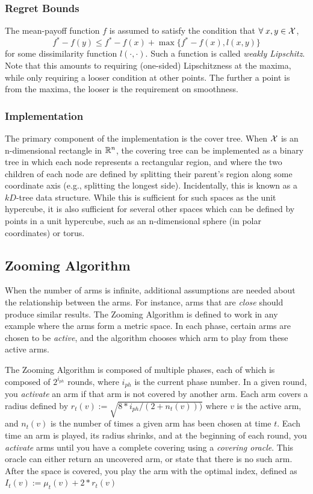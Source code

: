 \subsubsection{Regret Bounds}
The mean-payoff function $f$ is assumed to satisfy the condition that
$\forall \; x,y \in {\mathcal{X}}$,
\begin{equation*}
  f^* - f(y) \leq f^* - f(x) + \max \{f^* - f(x), l(x,y) \}
\end{equation*}
for some dissimilarity function $l(\cdot, \cdot)$. Such a function is
called \emph{weakly Lipschitz}. Note that this amounts to requiring
(one-sided) Lipschitzness at the maxima, while only requiring a looser
condition at other points. The further a point is from the maxima, the
looser is the requirement on smoothness.



\subsubsection{Implementation}
The primary component of the implementation is the cover tree. When
${\mathcal{X}}$ is an n-dimensional rectangle in $\mathbb{R}^n$, the covering tree
can be implemented as a binary tree in which each node represents a
rectangular region, and where the two children of each node are
defined by splitting their parent's region along some coordinate axis
(e.g., splitting the longest side). Incidentally, this is known as a
$kD$-tree data structure. While this is sufficient for such spaces as
the unit hypercube, it is also sufficient for several other spaces
which can be defined by points in a unit hypercube, such as an
n-dimensional sphere (in polar coordinates) or torus.

\subsection{Zooming Algorithm}
When the number of arms is infinite, additional assumptions are needed
about the relationship between the arms. For instance, arms that are
\emph{close} should produce similar results. The Zooming Algorithm is
defined to work in any example where the arms form a metric space. In
each phase, certain arms are chosen to be \emph{active}, and the
algorithm chooses which arm to play from these active arms.

The Zooming Algorithm is composed of multiple phases, each of which is
composed of $2^{i_{ph}}$ rounds, where $i_{ph}$ is the current phase
number. In a given round, you \emph{activate} an arm if that arm is
not covered by another arm. Each arm covers a radius defined by
$r_t(v):=\sqrt{8*i_{ph}/(2+n_t(v)))}$ where $v$ is the active arm, and
$n_t(v)$ is the number of times a given arm has been chosen at time
$t$. Each time an arm is played, its radius shrinks, and at the
beginning of each round, you \emph{activate} arms until you have a
complete covering using a \emph{covering oracle}. This oracle can
either return an uncovered arm, or state that there is no such
arm. After the space is covered, you play the arm with the optimal
index, defined as $I_t(v):=\mu_t(v)+2*r_t(v)$

